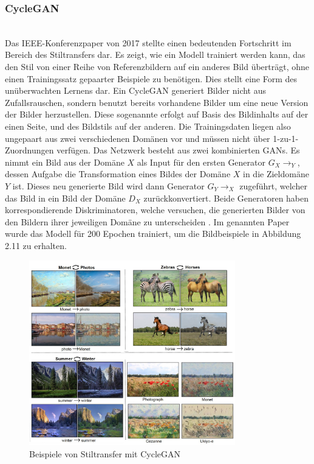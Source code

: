 \subsubsection{CycleGAN}~\\
Das IEEE-Konferenzpaper von 2017 \cite{zhu17} stellte einen bedeutenden Fortschritt im Bereich des Stiltransfers dar. Es zeigt, wie ein Modell trainiert werden kann, das den Stil von einer Reihe von Referenzbildern auf ein anderes Bild überträgt, ohne einen Trainingssatz gepaarter Beispiele zu benötigen. Dies stellt eine Form des unüberwachten Lernens dar.
Ein CycleGAN generiert Bilder nicht aus Zufallsrauschen, sondern benutzt bereits vorhandene Bilder um eine neue Version der Bilder herzustellen. Diese sogenannte  erfolgt auf Basis des Bildinhalts auf der einen Seite, und des Bildstils auf der anderen. Die Trainingsdaten liegen also ungepaart aus zwei verschiedenen Domänen vor und müssen nicht über 1-zu-1-Zuordnungen verfügen. Das Netzwerk besteht aus zwei kombinierten GANs. Es nimmt ein Bild aus der Domäne $X$ als Input für den ersten Generator $G_X{\scriptscriptstyle\rightarrow}_Y$, dessen Aufgabe die Transformation eines Bildes der Domäne $X$ in die Zieldomäne $Y$ ist. Dieses neu generierte Bild wird dann Generator $G_Y{\scriptscriptstyle\rightarrow}_X$ zugeführt, welcher das Bild in ein Bild der Domäne $D_X$ zurückkonvertiert. Beide Generatoren haben korrespondierende Diskriminatoren, welche versuchen, die generierten Bilder von den Bildern ihrer jeweiligen Domäne zu unterscheiden \cite{zhu17}. Im genannten Paper wurde das Modell für 200 Epochen trainiert, um die Bildbeispiele in Abbildung 2.11 zu erhalten.
\begin{figure}[H]
    \centering
    \includegraphics[width=0.8\textwidth,angle=0]{abb/CycleGAN_Beispiel}
    \caption[Beispiele von Stiltransfer mit CycleGAN]{Beispiele von Stiltransfer mit CycleGAN \cite{zhu17}}
\end{figure}